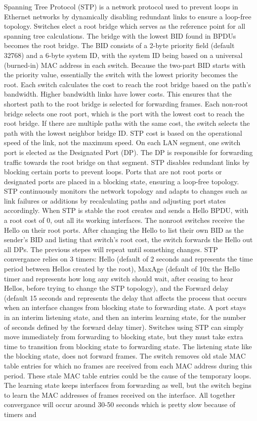 \documentclass{article}
\begin{document}
	Spanning Tree Protocol (STP) is a network protocol used to prevent loops in Ethernet networks by dynamically disabling redundant links to ensure a loop-free topology. Switches elect a root bridge which serves as the reference point for all spanning tree calculations. The bridge with the lowest BID found in BPDUs becomes the root bridge. The BID consists of a 2-byte priority field (default 32768) and a 6-byte system ID, with the system ID being based on a universal (burned-in) MAC address in each switch. Because the two-part BID starts with the priority value, essentially the switch with the lowest priority becomes the root. Each switch calculates the cost to reach the root bridge based on the path's bandwidth. Higher bandwidth links have lower costs. This ensures that the shortest path to the root bridge is selected for forwarding frames. Each non-root bridge selects one root port, which is the port with the lowest cost to reach the root bridge. If there are multiple paths with the same cost, the switch selects the path with the lowest neighbor bridge ID. STP cost is based on the operational speed of the link, not the maximum speed. On each LAN segment, one switch port is elected as the Designated Port (DP). The DP is responsible for forwarding traffic towards the root bridge on that segment. STP disables redundant links by blocking certain ports to prevent loops. Ports that are not root ports or designated ports are placed in a blocking state, ensuring a loop-free topology. STP continuously monitors the network topology and adapts to changes such as link failures or additions by recalculating paths and adjusting port states accordingly. When STP is stable the root creates and sends a Hello BPDU, with a root cost of 0, out all its working interfaces. The nonroot switches receive the Hello on their root ports. After changing the Hello to list their own BID as the sender's BID and listing that switch's root cost, the switch forwards the Hello out all DPs. The previous stepes will repeat until something changes. STP convergance relies on 3 timers: Hello (default of 2 seconds and represents the time period between Hellos created by the root), MaxAge (default of 10x the Hello timer and represents how long any switch should wait, after ceasing to hear Hellos, before trying to change the STP topology), and the Forward delay (default 15 seconds and represents the delay that affects the process that occurs when an interface changes from blocking state to forwarding state. A port stays in an interim listening state, and then an interim learning state, for the number of seconds defined by the forward delay timer). Switches using STP can simply move immediately from forwarding to blocking state, but they must take extra time to transition from blocking state to forwarding state. The listening state like the blocking state, does not forward frames. The switch removes old stale MAC table entries for which no frames are received from each MAC address during this period. These stale MAC table entries could be the cause of the temporary loops. The learning state keeps interfaces from forwarding as well, but the switch begins to learn the MAC addresses of frames received on the interface. All together convergance will occur around 30-50 seconds which is pretty slow because of timers and 
\end{document}
